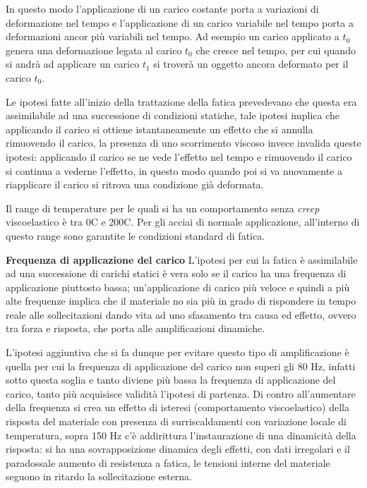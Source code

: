 \documentclass{article}
\begin{document}
\begin{adjustwidth}{2in}{}
			 In questo modo l'applicazione di un carico costante porta a variazioni di deformazione nel tempo e l'applicazione di un carico variabile nel tempo porta a deformazioni ancor più variabili nel tempo. Ad esempio un carico applicato a $t_0$ genera una deformazione legata al carico $t_0$ che cresce nel tempo, per cui quando si andrà ad applicare un carico $t_1$ si troverà un oggetto ancora deformato per il carico $t_0$. \newline
			 
			 Le ipotesi fatte all'inizio della trattazione della fatica prevedevano che questa era assimilabile ad una successione di condizioni statiche, tale ipotesi implica che applicando il carico si ottiene istantaneamente un effetto che si annulla rimuovendo il carico, la presenza di uno scorrimento viscoso invece invalida queste ipotesi: applicando il carico se ne vede l'effetto nel tempo e rimuovendo il carico si continua a vederne l'effetto, in questo modo quando poi si va nuovamente a riapplicare il carico si ritrova una condizione già deformata. \newline 
			 
			 Il range di temperature per le quali si ha un comportamento senza \textit{creep} viscoelastico è tra 0\degree C e 200\degree C. Per gli acciai di normale applicazione, all'interno di questo range sono garantite le condizioni standard di fatica. \newpage
			 
			\textbf{\Large Frequenza di applicazione del carico}\newline
			 L'ipotesi per cui la fatica è assimilabile ad una successione di carichi statici è vera solo se il carico ha una frequenza di applicazione piuttosto bassa; un'applicazione di carico più veloce e quindi a più alte frequenze implica che il materiale no sia più in grado di rispondere in tempo reale alle sollecitazioni dando vita ad uno sfasamento tra causa ed effetto, ovvero tra forza e risposta, che porta alle amplificazioni dinamiche. \newline 
			 
			 L'ipotesi aggiuntiva che si fa dunque per evitare questo tipo di amplificazione è quella per cui la frequenza di applicazione del carico non superi gli $80$ Hz, infatti sotto questa soglia e tanto diviene più bassa la frequenza di applicazione del carico, tanto più acquisisce validità l'ipotesi di partenza. Di contro all'aumentare della frequenza si crea un effetto di isteresi (comportamento viscoelastico) della risposta del materiale con presenza di surriscaldamenti con variazione locale di temperatura, sopra 150 Hz c'è addirittura l'instaurazione di una dinamicità della risposta: si ha una sovrapposizione dinamica degli effetti, con dati irregolari e il paradossale aumento di resistenza a fatica, le tensioni interne del materiale seguono in ritardo la sollecitazione esterna. \newline
			 

\end{adjustwidth}
\end{document}
